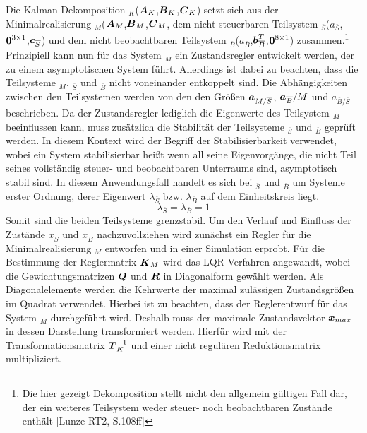 Die Kalman-Dekomposition $_K$($\boldsymbol{A}_K$,$\boldsymbol{B}_K$,$\boldsymbol{C}_K$) setzt sich aus der Minimalrealisierung $_M$($\boldsymbol{A}_M$,$\boldsymbol{B}_M$,$\boldsymbol{C}_M$, dem nicht steuerbaren Teilsystem $_{\overline{S}}$($a_{\overline{S}}$,$\boldsymbol{0}^{3\times 1}$,$\boldsymbol{c}_{\overline{S}}$) und dem nicht beobachtbaren Teilsystem $_{\overline{B}}$($a_{\overline{B}}$,$\boldsymbol{b}^T_{\overline{B}}$,$\boldsymbol{0}^{8\times 1}$) zusammen.\footnote{Die hier gezeigt Dekomposition stellt nicht den allgemein gültigen Fall dar, der ein weiteres Teilsystem weder steuer- noch beobachtbaren Zustände enthält [Lunze RT2, S.108ff]} Prinzipiell kann nun für das System $_M$ ein Zustandsregler entwickelt werden, der zu einem asymptotischen System führt. Allerdings ist dabei zu beachten, dass die Teilsysteme $_M$, $_{\overline{S}}$ und $_{\overline{B}}$ nicht voneinander entkoppelt sind. Die Abhängigkeiten zwischen den Teilsystemen werden von den den Größen $\boldsymbol{a}_{M/\overline{S}}$, $\boldsymbol{a}_{\overline{B}}/M$ und $a_{\overline{B}/\overline{S}}$ beschrieben. Da der Zustandsregler lediglich die Eigenwerte des Teilsystem $_M$ beeinflussen kann, muss zusätzlich die Stabilität der Teilsysteme $_{\overline{S}}$ und $_{\overline{B}}$ geprüft werden. In diesem Kontext wird der Begriff der Stabilisierbarkeit verwendet, wobei ein System stabilisierbar heißt wenn all seine Eigenvorgänge, die nicht Teil seines vollständig steuer- und beobachtbaren Unterraums sind, asymptotisch stabil sind. In diesem Anwendungsfall handelt es sich bei $_{\overline{S}}$ und $_{\overline{B}}$ um Systeme erster Ordnung, derer Eigenwert $\lambda_{\overline{S}}$ bzw. $\lambda_{\overline{B}}$ auf dem Einheitskreis liegt.
\begin{equation}
\lambda_{\overline{S}} = \lambda_{\overline{B}} = 1
\end{equation}
Somit sind die beiden Teilsysteme grenzstabil. Um den Verlauf und Einfluss der Zustände $x_{\overline{S}}$ und $x_{\overline{B}}$ nachzuvollziehen wird zunächst ein Regler für die Minimalrealisierung $_M$ entworfen und in einer Simulation erprobt. Für die Bestimmung der Reglermatrix $\boldsymbol{K}_M$ wird das LQR-Verfahren angewandt, wobei die Gewichtungsmatrizen $\boldsymbol{Q}$ und $\boldsymbol{R}$ in Diagonalform gewählt werden. Als Diagonalelemente werden die Kehrwerte der maximal zulässigen Zustandsgrößen im Quadrat verwendet. Hierbei ist zu beachten, dass der Reglerentwurf für das System $_M$ durchgeführt wird. Deshalb muss der maximale Zustandsvektor $\boldsymbol{x}_{max}$ in dessen Darstellung transformiert werden. Hierfür wird mit der Transformationsmatrix $\boldsymbol{T}^{-1}_K$ und einer nicht regulären Reduktionsmatrix multipliziert.
